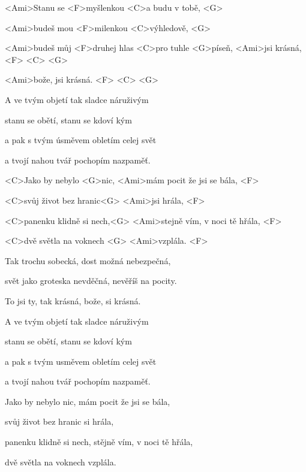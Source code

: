 

\zs
<Ami>Stanu se <F>myšlenkou <C>a budu v tobě, <G>

<Ami>budeš mou <F>milenkou <C>výhledově, <G>

<Ami>budeš můj <F>druhej hlas <C>pro tuhle <G>píseň, 
<Ami>jsi krásná, <F> <C> <G>

<Ami>bože, jsi krásná. <F> <C> <G>
\ks

\zs
A ve tvým objetí tak sladce náruživým

stanu se obětí, stanu se kdoví kým

a pak s tvým úsměvem obletím celej svět

a tvojí nahou tvář pochopím nazpaměť.
\ks

\zr
<C>Jako by nebylo <G>nic, <Ami>mám pocit že jsi se bála, <F>

<C>svůj život bez hranic<G> <Ami>jsi hrála, <F>

<C>panenku klidně si nech,<G> <Ami>stejně vím, v noci tě hřála, <F>

<C>dvě světla na voknech <G> <Ami>vzplála. <F>
\kr

\zs
Tak trochu sobecká, dost možná nebezpečná,

svět jako groteska nevděčná, nevěříš na pocity.

To jsi ty, tak krásná, bože, si krásná.



A ve tvým objetí tak sladce náruživým

stanu se obětí, stanu se kdoví kým

a pak s tvým usměvem obletím celej svět

a tvojí nahou tvář pochopím nazpaměť.
\ks


\zr
Jako by nebylo nic, mám pocit že jsi se bála,

svůj život bez hranic si hrála,

panenku klidně si nech, stějně vím, v noci tě hřála,

dvě světla na voknech vzplála.
\kr
\kp
